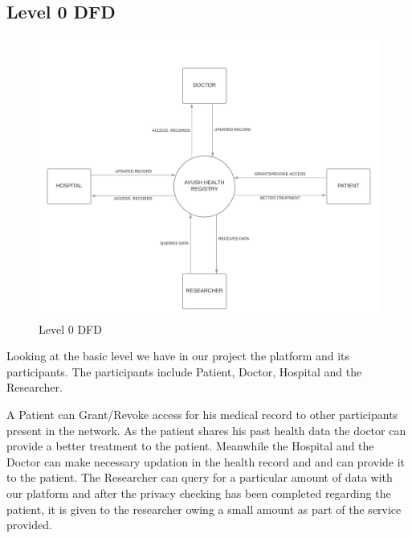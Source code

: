 \documentclass[11pt]{report}
\begin{document}
\subsection{Level 0 DFD}
    \begin{figure}[h!]
        \centering
        \includegraphics[scale=0.6]{DFD0.jpeg}
        \caption{Level 0 DFD}
        \label{fig:my_label}
    \end{figure}
    \par
    Looking at the basic level we have in our project the platform and its participants. The participants include Patient, Doctor, Hospital and the Researcher.
    \par A Patient can Grant/Revoke access for his medical record to other participants present in the network. As the patient shares his past health data the doctor can provide a better treatment to the patient. Meanwhile the Hospital and the Doctor can make necessary updation in the health record and and can provide it to the patient. The Researcher can query for a particular amount of data with our platform and after the privacy checking has been completed regarding the patient, it is given to the researcher owing a small amount as part of the service provided.
    \newpage
\end{document}
